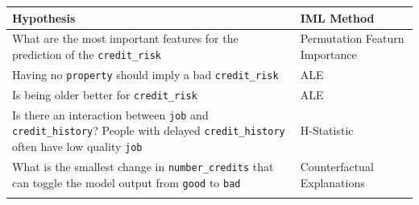 \documentclass[
]{article}
\begin{document}
\begin{longtable}[]{@{}ll@{}}
\toprule
\begin{minipage}[b]{0.47\columnwidth}\raggedright
Hypothesis\strut
\end{minipage} & \begin{minipage}[b]{0.47\columnwidth}\raggedright
IML Method\strut
\end{minipage}\tabularnewline
\midrule
\endhead
\begin{minipage}[t]{0.47\columnwidth}\raggedright
What are the most important features for the prediction of the \texttt{credit\_risk}\strut
\end{minipage} & \begin{minipage}[t]{0.47\columnwidth}\raggedright
Permutation Featurn Importance\strut
\end{minipage}\tabularnewline
\begin{minipage}[t]{0.47\columnwidth}\raggedright
Having no \texttt{property} should imply a bad \texttt{credit\_risk}\strut
\end{minipage} & \begin{minipage}[t]{0.47\columnwidth}\raggedright
ALE\strut
\end{minipage}\tabularnewline
\begin{minipage}[t]{0.47\columnwidth}\raggedright
Is being older better for \texttt{credit\_risk}\strut
\end{minipage} & \begin{minipage}[t]{0.47\columnwidth}\raggedright
ALE\strut
\end{minipage}\tabularnewline
\begin{minipage}[t]{0.47\columnwidth}\raggedright
Is there an interaction between \texttt{job} and \texttt{credit\_history}? People with delayed \texttt{credit\_history} often have low quality \texttt{job}\strut
\end{minipage} & \begin{minipage}[t]{0.47\columnwidth}\raggedright
H-Statistic\strut
\end{minipage}\tabularnewline
\begin{minipage}[t]{0.47\columnwidth}\raggedright
What is the smallest change in \texttt{number\_credits} that can toggle the model output from \texttt{good} to \texttt{bad}\strut
\end{minipage} & \begin{minipage}[t]{0.47\columnwidth}\raggedright
Counterfactual Explanations\strut
\end{minipage}\tabularnewline
\begin{minipage}[t]{0.47\columnwidth}\raggedright

\end{minipage}
\end{longtable}
\end{document}
